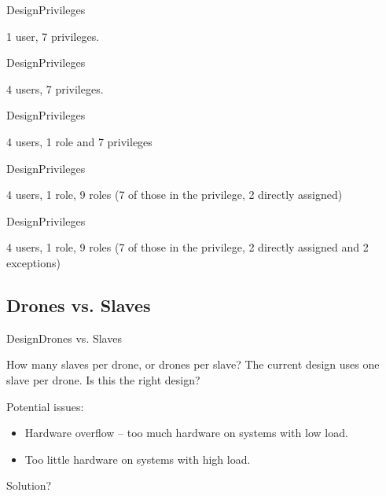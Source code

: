 \begin{frame}{Design}{Privileges}
  \begin{block}{}
  	1 user, 7 privileges.
  \end{block}
\end{frame}

\begin{frame}{Design}{Privileges}
  \begin{block}{}
  	4 users, 7 privileges. 
  \end{block}
\end{frame}

\begin{frame}{Design}{Privileges}
  \begin{block}{}
  	4 users, 1 role and 7 privileges
  \end{block}
\end{frame}

\begin{frame}{Design}{Privileges}
  \begin{block}{}
  	4 users, 1 role, 9 roles (7 of those in the privilege, 2 directly assigned)
  \end{block}
\end{frame}

\begin{frame}{Design}{Privileges}
  \begin{block}{}
  	4 users, 1 role, 9 roles (7 of those in the privilege, 2 directly assigned and 2 exceptions)
  \end{block}
\end{frame}



\subsection{Drones vs. Slaves}
\begin{frame}{Design}{Drones vs. Slaves}
  \begin{block}{How many slaves per drone, or drones per slave?}
	The current design uses one slave per drone. Is this the right design?

	Potential issues:
	\begin{itemize}
		\item Hardware overflow -- too much hardware on systems with low load.
		\item Too little hardware on systems with high load.
	\end{itemize}

	Solution?
  \end{block}
\end{frame}



